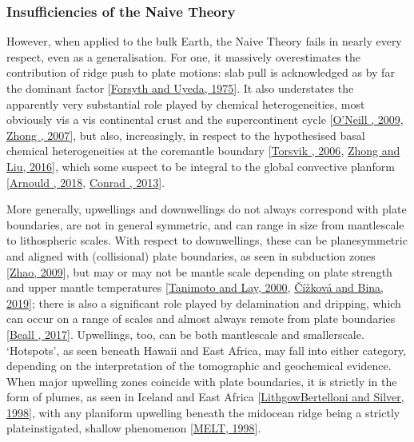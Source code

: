 \documentclass[letterpaper,10pt,english]{jupyterBook}
\begin{document}
\subsubsection{Insufficiencies of the Naive Theory}
\label{\detokenize{content/chapter_01_background/main:insufficiencies-of-the-naive-theory}}
\sphinxAtStartPar
However, when applied to the bulk Earth, the Naive Theory fails in nearly every respect, even as a generalisation. For one, it massively overestimates the contribution of ridge push to plate motions: slab pull is acknowledged as by far the dominant factor {[}\hyperlink{cite.references:id514}{Forsyth and Uyeda, 1975}{]}. It also understates the apparently very substantial role played by chemical heterogeneities, most obviously vis a vis continental crust and the supercontinent cycle {[}\hyperlink{cite.references:id529}{O'Neill , 2009}, \hyperlink{cite.references:id111}{Zhong , 2007}{]}, but also, increasingly, in respect to the hypothesised basal chemical heterogeneities at the core\sphinxhyphen{}mantle boundary {[}\hyperlink{cite.references:id516}{Torsvik , 2006}, \hyperlink{cite.references:id329}{Zhong and Liu, 2016}{]}, which some suspect to be integral to the global convective planform {[}\hyperlink{cite.references:id400}{Arnould , 2018}, \hyperlink{cite.references:id521}{Conrad , 2013}{]}.

\sphinxAtStartPar
More generally, upwellings and downwellings do not always correspond with plate boundaries, are not in general symmetric, and can range in size from mantle\sphinxhyphen{}scale to lithospheric scales. With respect to downwellings, these can be plane\sphinxhyphen{}symmetric and aligned with (collisional) plate boundaries, as seen in subduction zones {[}\hyperlink{cite.references:id520}{Zhao, 2009}{]}, but may or may not be mantle scale depending on plate strength and upper mantle temperatures {[}\hyperlink{cite.references:id512}{Tanimoto and Lay, 2000}, \hyperlink{cite.references:id513}{Čížková and Bina, 2019}{]}; there is also a significant role played by delamination and dripping, which can occur on a range of scales and almost always remote from plate boundaries {[}\hyperlink{cite.references:id517}{Beall , 2017}{]}. Upwellings, too, can be both mantle\sphinxhyphen{}scale and smaller\sphinxhyphen{}scale. ‘Hotspots’, as seen beneath Hawaii and East Africa, may fall into either category, depending on the interpretation of the tomographic and geochemical evidence. When major upwelling zones coincide with plate boundaries, it is strictly in the form of plumes, as seen in Iceland and East Africa {[}\hyperlink{cite.references:id515}{Lithgow\sphinxhyphen{}Bertelloni and Silver, 1998}{]}, with any planiform upwelling beneath the mid\sphinxhyphen{}ocean ridge being a strictly plate\sphinxhyphen{}instigated, shallow phenomenon {[}\hyperlink{cite.references:id518}{MELT, 1998}{]}.
\end{document}
